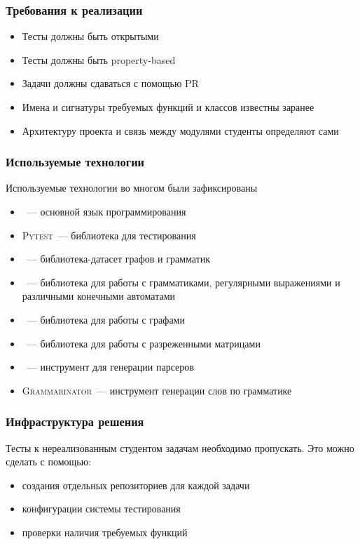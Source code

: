 \documentclass[aspectratio=169]{beamer}
\begin{document}
\begin{frame}
	\frametitle{Требования к реализации}

	\begin{itemize}
		\item Тесты должны быть открытыми
		\item Тесты должны быть property-based
		\item Задачи должны сдаваться с помощью PR
		\item Имена и сигнатуры требуемых функций и классов известны заранее
		\item Архитектуру проекта и связь между модулями студенты определяют сами
	\end{itemize}

\end{frame}

\begin{frame}
	\frametitle{Используемые технологии}

	Используемые технологии во многом были зафиксированы
	\begin{itemize}
		\item \python{}~--- основной язык программирования
		\item \textsc{Pytest}~--- библиотека для тестирования
		\item \cfpqdata{}~--- библиотека-датасет графов и грамматик
		\item \pyformlang{}~--- библиотека для работы с грамматиками, регулярными выражениями и различными конечными автоматами
		\item \networkx{}~--- библиотека для работы с графами
		\item \scipy{}~--- библиотека для работы с разреженными матрицами
		\item \antlr{}~--- инструмент для генерации парсеров
		\item \textsc{Grammarinator}~--- инструмент генерации слов по грамматике \antlr{}
	\end{itemize}

\end{frame}

\begin{frame}
	\frametitle{Инфраструктура решения}

	Тесты к нереализованным студентом задачам необходимо пропускать.
	Это можно сделать с помощью:
	\begin{itemize}
		\item создания отдельных репозиториев для каждой задачи
		\item конфигурации системы тестирования
		\item проверки наличия требуемых функций
	\end{itemize}

\end{frame}
\end{document}
